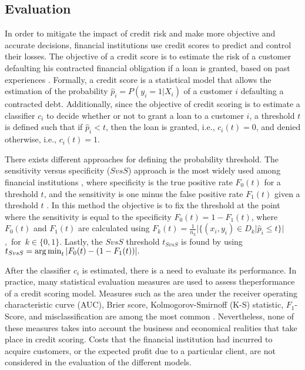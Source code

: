   \subsection{Evaluation}
    In order to mitigate the impact of credit risk and make more objective and accurate decisions, 
  financial institutions use credit scores to predict and control their losses. The objective of a 
  credit score is to estimate the risk of a  customer defaulting his contracted financial 
  obligation if a loan is granted, based on past experiences \citep{Anderson2007}. Formally, a 
credit 
  score is a statistical model that allows the estimation of the probability $\hat 
  p_i=P(y_i=1|X_i)$ of a customer $i$ defaulting a contracted debt. Additionally, since the 
  objective of credit scoring is to estimate a classifier $c_i$ to decide whether or not to grant a 
  loan to a customer $i$, a threshold $t$ is defined such that if $\hat p_i <t$, then the loan is 
  granted, i.e., $c_i(t)=0$, and denied otherwise, i.e., $c_i(t)=1$.
  
  There exists different approaches for defining the probability threshold. The sensitivity versus 
  specificity ($SvsS$) approach is the most widely used among financial institutions 
  \citep{Anderson2007}, where specificity is the true positive rate $F_0(t)$ for a threshold $t$, 
  and the sensitivity is one minus the false positive rate $F_1(t)$ given a threshold $t$ 
  \citep{Hernandez-Orallo2012}. In this method the objective is to fix the threshold at the point 
  where the sensitivity is equal to the specificity $F_0(t)=1-F_1(t)$, where $F_0(t)$ and $F_1(t)$ 
  are calculated using \mbox{$F_k(t)=\frac{1}{n_k}\vert \{ ( x_i,y_i ) \in D_k \vert \hat p_i \le t 
  \}\vert$, for $k\in\{0,1\}.$} Lastly, the $SvsS$ threshold $t_{SvsS}$ is found by using 
  \mbox{$t_{SvsS}= \operatorname*{arg\,min}_t \vert F_0(t) - (1-F_1(t)) \vert.$}
  
  After the classifier $c_i$ is estimated, there is a need to evaluate its performance. In 
  practice, many statistical evaluation measures are used to assess theperformance of a credit 
  scoring model. Measures such as the area under the  receiver operating characteristic curve (AUC),
  Brier score, Kolmogorov-Smirnoff (K-S) statistic,  $F_1$-Score, and misclassification are among 
  the most common \citep{Beling2005}. Nevertheless, none of these measures takes into account the 
  business and economical realities that take place in credit scoring. Costs that the financial 
  institution had incurred to acquire customers, or the expected profit due to a particular client, 
  are not considered in the evaluation of the different models.
  
